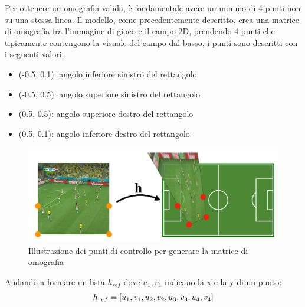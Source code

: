 \documentclass{article}
\begin{document}
Per ottenere un omografia valida, è fondamentale avere un minimo di 4 punti non su una stessa linea. Il modello, come precedentemente descritto, crea una matrice di omografia fra l'immagine di gioco e il campo 2D, prendendo 4 punti che tipicamente contengono la visuale del campo dal basso, i punti sono descritti con i seguenti valori:
\begin{itemize}
    \item(-0.5, 0.1): angolo inferiore sinistro del rettangolo
    \item(-0.5, 0.5): angolo superiore sinistro del rettangolo
    \item(0.5, 0.5): angolo superiore destro del rettangolo
    \item(0.5, 0.1): angolo inferiore destro del rettangolo
\end{itemize}
\begin{figure}[h]
    \centering
    \includegraphics[width=0.7\linewidth]{capitoli/Hiniziale.png}
    \caption{Illustrazione dei punti di controllo per generare la matrice di omografia}
    \label{fig:enter-label}
\end{figure}
Andando a formare un lista \textbf{\begin{math}{h_{ref}}\end{math}} dove \begin{math}{u_1, v_1}\end{math} indicano la x e la y di un punto:
\[ \textbf{{\begin{math}{h_{ref}}\end{math}}} = [u_1, v_1, u_2, v_2, u_3, v_3, u_4, v_4 ] \]
\end{document}

